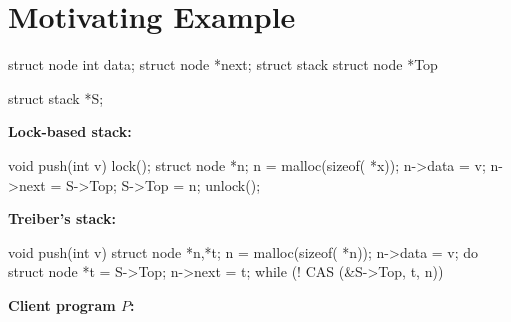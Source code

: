 
\section{Motivating Example}

\begin{figure*}[t]
\lstset{numbers=left, 
            numberstyle=\tiny\tt, 
            stepnumber=1, 
            firstnumber=1,
            numbersep=4pt}
\begin{minipage}{5cm}
\begin{program}
struct node {
	int data;
	struct node *next;
}
struct stack {
	struct node *Top
}
  
struct stack *S;
\end{program}
\end{minipage}
\begin{minipage}{6.5cm}
{\bf Lock-based stack:}
\begin{program}
void push(int v) {
	lock();
	struct node *n;
	n = malloc(sizeof( *x));
	n->data = v;
	n->next = S->Top;
	S->Top = n;
	unlock();
}

\end{program}
\end{minipage}
\begin{minipage}{6cm}
{\bf Treiber's stack:}
\begin{program}
void push(int v) {
	struct node *n,*t;
	n = malloc(sizeof( *n));
	n->data = v;
	do {
		struct node *t = S->Top;
		n->next = t;
	} while (! CAS (&S->Top, t, n))
}
\end{program}
\end{minipage}

\begin{minipage}{5cm}
\lstset{numbers=none}
{\bf Client program $P$:}


\end{minipage}
\end{figure*}
